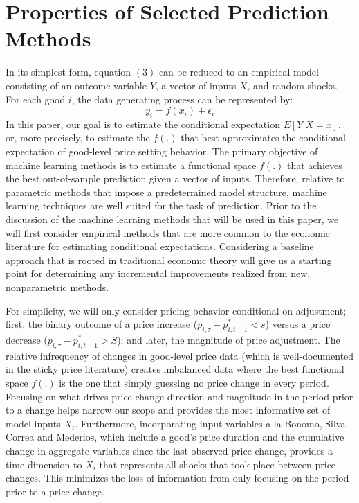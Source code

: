 \documentclass[11pt]{article}
\begin{document}
\section{Properties of Selected Prediction Methods}
In its simplest form, equation $(3)$ can be reduced to an empirical model consisting of an outcome variable $Y$, a vector of inputs $X$, and random shocks. For each good $i$, the data generating process can be represented by:
%
\begin{equation*}
    y_{i} = f(x_{i}) + \epsilon_{i}
\end{equation*}
%
In this paper, our goal is to estimate the conditional expectation $E[Y|X = x]$, or, more precisely, to estimate the $f(.)$ that best approximates the conditional expectation of good-level price setting behavior. The primary objective of machine learning methods is to estimate a functional space $f(.)$ that achieves the best out-of-sample prediction given a vector of inputs. Therefore, relative to parametric methods that impose a predetermined model structure, machine learning techniques are well suited for the task of prediction. Prior to the discussion of the machine learning methods that will be used in this paper, we will first consider empirical methods that are more common to the economic literature for estimating conditional expectations. Considering a baseline approach that is rooted in traditional economic theory will give us a starting point for determining any incremental improvements realized from new, nonparametric methods. 

For simplicity, we will only consider pricing behavior conditional on adjustment; first, the binary outcome of a price increase ($p_{i,\tau} - p^{*}_{i,t-1} < s$) versus a price decrease ($p_{i,\tau} - p^{*}_{i,t-1} > S$); and later, the magnitude of price adjustment. The relative infrequency of changes in good-level price data (which is well-documented in the sticky price literature)  creates imbalanced data where the best functional space $f(.)$ is the one that simply guessing no price change in every period.  Focusing on what drives price change direction and magnitude in the period prior to a change helps narrow our scope and provides the most informative set of model inputs $X_{i}$. Furthermore, incorporating input variables a la Bonomo, Silva Correa and Mederios, which include a good's price duration and the cumulative change in aggregate variables since the last observed price change, provides a time dimension to $X_{i}$ that represents all shocks that took place between price changes. This minimizes the loss of information from only focusing on the period prior to a price change.      
\end{document}
